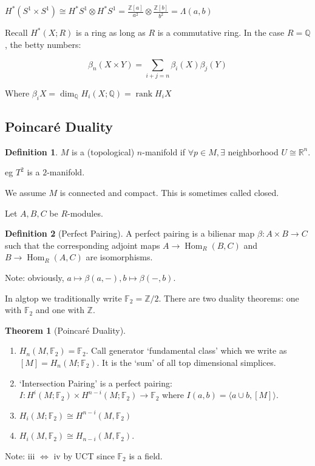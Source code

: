 \documentclass{article}
\theoremstyle{definition}
\newtheorem*{definition}{Definition}
\newtheorem{theorem}{Theorem}
\begin{document}
    \(H^{\ast} (S^1 \times S^1) \cong H^{\ast} S^1 \otimes H^{\ast} S^1 = \frac{\mathbb{Z}[a]}{a^2} \otimes \frac{\mathbb{Z}[b]}{b^2} = \Lambda(a,b)\) 

    Recall \(H^{\ast} (X;R)\) is a ring as long as \(R\) is a commutative ring. In the case \(R = \mathbb{Q}\), the betty numbers:

    \[
        \beta_n(X \times Y) = \sum_{i+j=n} \beta_i(X) \beta_j(Y)
    \]

    Where \(\beta_i X = \dim_{\mathbb{Q}} H_{i}(X;\mathbb{Q}) = \operatorname{rank} H_i X\) 

    \subsection*{Poincar\'e Duality}

    \begin{definition}
        \(M\) is a (topological) \(n\)-manifold if \(\forall p\in M, \exists\) neighborhood \(U \cong \mathbb{R}^n\).

        eg \(T^2\) is a \(2\)-manifold.

        We assume \(M\) is connected and compact. This is sometimes called closed.
    \end{definition}

    Let \(A,B,C\) be \(R\)-modules.

    \begin{definition}
        [Perfect Pairing] A perfect pairing is a bilienar map \(\beta : A \times B \to C\) such that the corresponding adjoint maps \(A \to \operatorname{Hom}_R(B,C)\) and \(B \to \operatorname{Hom}_R(A,C)\) are isomorphisms.
        
        Note: obviously, \(a \mapsto \beta(a,-), b \mapsto \beta(-,b)\).
    \end{definition}

    In algtop we traditionally write \(\mathbb{F}_2 = \mathbb{Z} / 2\). There are two duality theorems: one with \(\mathbb{F}_2\) and one with \(\mathbb{Z}\).

    \begin{theorem}
        [Poincar\'e Duality]

        \begin{enumerate}[label=\roman*)]
            \item \(H_n(M, \mathbb{F}_2) = \mathbb{F}_2\). Call generator `fundamental class' which we write as \([M] = H_n(M; \mathbb{F}_2)\). It is the `sum' of all top dimensional simplices.
            \item `Intersection Pairing' is a perfect pairing: \(I: H^i(M; \mathbb{F}_2) \times H^{n-i} (M; \mathbb{F}_2) \to \mathbb{F}_2\) where \(I(a,b) = \langle a \cup b, [M] \rangle\).
            \item \(H_i(M;\mathbb{F}_2) \cong H^{n-i} (M, \mathbb{F}_2)\) 
            \item \(H_i(M, \mathbb{F}_2) \cong H_{n-i} (M, \mathbb{F}_2)\).
        \end{enumerate} 

        Note: iii \(\iff\) iv by UCT since \(\mathbb{F}_2\) is a field.
    \end{theorem}
\end{document}
